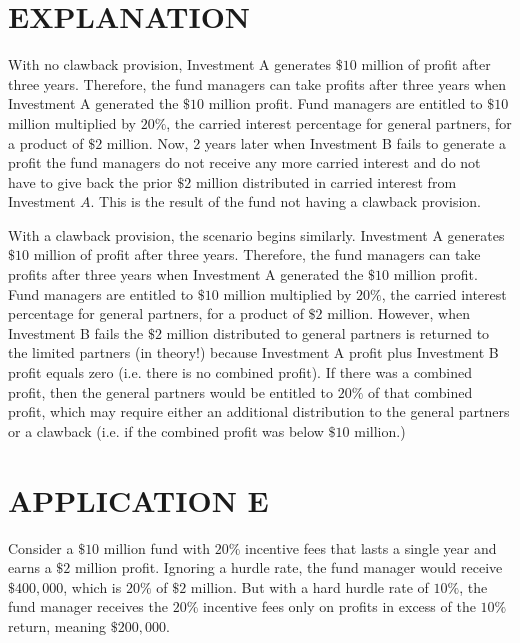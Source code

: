 \documentclass[11pt]{article}
\begin{document}
\section*{EXPLANATION}
With no clawback provision, Investment A generates $\$ 10$ million of profit after three years. Therefore, the fund managers can take profits after three years when Investment A generated the $\$ 10$ million profit. Fund managers are entitled to $\$ 10$ million multiplied by $20 \%$, the carried interest percentage for general partners, for a product of $\$ 2$ million. Now, 2 years later when Investment B fails to generate a profit the fund managers do not receive any more carried interest and do not have to give back the prior $\$ 2$ million distributed in carried interest from Investment $A$. This is the result of the fund not having a clawback provision.

With a clawback provision, the scenario begins similarly. Investment A generates $\$ 10$ million of profit after three years. Therefore, the fund managers can take profits after three years when Investment A generated the $\$ 10$ million profit. Fund managers are entitled to $\$ 10$ million multiplied by $20 \%$, the carried interest percentage for general partners, for a product of $\$ 2$ million. However, when Investment B fails the $\$ 2$ million distributed to general partners is returned to the limited partners (in theory!) because Investment A profit plus Investment B profit equals zero (i.e. there is no combined profit). If there was a combined profit, then the general partners would be entitled to $20 \%$ of that combined profit, which may require either an additional distribution to the general partners or a clawback (i.e. if the combined profit was below $\$ 10$ million.)

\section*{APPLICATION E}
Consider a $\$ 10$ million fund with $20 \%$ incentive fees that lasts a single year and earns a $\$ 2$ million profit. Ignoring a hurdle rate, the fund manager would receive $\$ 400,000$, which is $20 \%$ of $\$ 2$ million. But with a hard hurdle rate of $10 \%$, the fund manager receives the $20 \%$ incentive fees only on profits in excess of the $10 \%$ return, meaning $\$ 200,000$.
\end{document}

